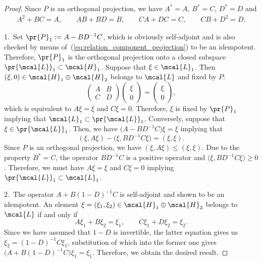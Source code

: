 \begin{proof}
Since $P$ is an orthogonal projection, we have $A^{\ast}=A$, $B^{\ast}=C$, $D^{\ast}=D$ and
\begin{gather}\label{eq:relation_component_peojection}
	A^{2}+BC =A, \qquad AB+BD =B, \qquad CA+DC = C, \qquad CB+D^{2} =D.
\end{gather}

1.~Set $\pr{P}_{1}:=A-BD^{-1}C$, which is obviously self-adjoint and is also checked by means of~(\ref{eq:relation_component_peojection}) to be an idempotent.
		Therefore, $\pr{P}_{1}$ is the orthogonal projection onto a closed subspace $\pr{\mcal{L}}_{1}\subset\mcal{H}_{1}$.
		Suppose that $\xi\in\mcal{L}_{1}$. Then $(\xi,0)\in\mcal{H}_{1}\oplus \mcal{H}_{2}$ belongs to $\mcal{L}$ and fixed by $P$:
		\begin{equation*}
		\left(
		\begin{matrix}
		A & B \\
		C & D
		\end{matrix}
		\right)\left(
		\begin{matrix}
		\xi \\
		0
		\end{matrix}
		\right)=\left(
		\begin{matrix}
		\xi \\
		0
		\end{matrix}
		\right),
		\end{equation*}
		which is equivalent to $A\xi=\xi$ and $C\xi=0$.
		Therefore, $\xi$ is fixed by $\pr{P}_{1}$ implying that $\mcal{L}_{1}\subset \pr{\mcal{L}}_{1}$.
		Conversely, suppose that $\xi\in \pr{\mcal{L}}_{1}$. Then, we have $\big(A-BD^{-1}C\big)\xi=\xi$ implying that
		\begin{equation*}
			(\xi,A\xi)-\big(\xi,BD^{-1}C\xi\big)=(\xi,\xi).
		\end{equation*}
		Since $P$ is an orthogonal projection, we have $(\xi,A\xi)\le (\xi,\xi)$. Due to the property $B^{\ast}=C$, the operator $BD^{-1}C$ is a positive operator and $\big(\xi,BD^{-1}C\xi\big)\ge 0$. Therefore, we must have $A\xi=\xi$ and $C\xi=0$ implying $\pr{\mcal{L}}_{1}\subset \mcal{L}_{1}$.

2.~The operator $A+B(1-D)^{-1}C$ is self-adjoint and shown to be an idempotent.
		An element $\xi=(\xi_{1},\xi_{2})\in\mcal{H}_{1}\oplus\mcal{H}_{2}$ belongs to $\mcal{L}$ if and only if
		\begin{equation*}
			A\xi_{1}+B\xi_{2}=\xi_{1},\qquad C\xi_{1}+D\xi_{2}=\xi_{2}.
		\end{equation*}
		Since we have assumed that $1-D$ is invertible, the latter equation gives us $\xi_{2}=(1-D)^{-1}C\xi_{1}$, substitution of which into the former one gives $\big(A+B(1-D)^{-1}C\big)\xi_{1}=\xi_{1}$. Therefore, we obtain the desired result.
\end{proof}

